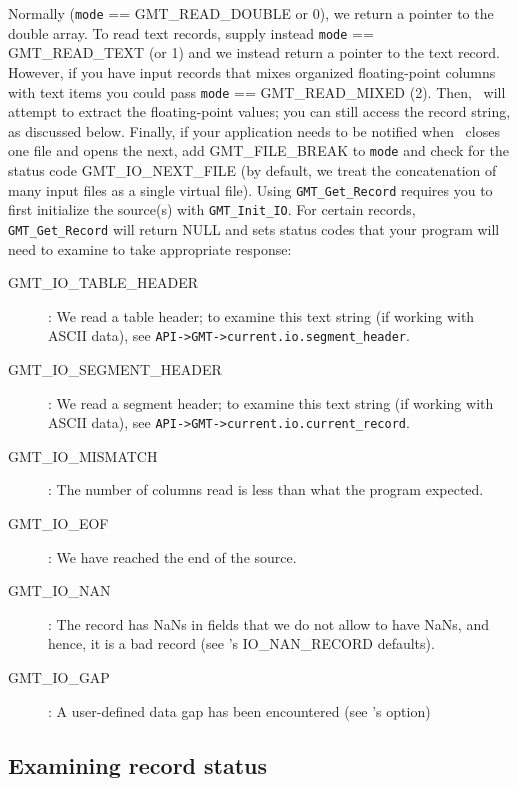 \documentclass[11pt]{report}
\begin{document}
Normally (\texttt{mode} == GMT\_READ\_DOUBLE or 0), we return a pointer to the double array.
To read text records, supply instead \texttt{mode} == GMT\_READ\_TEXT (or 1) and we
instead return a pointer to the text record.
However, if you have input records that mixes organized floating-point columns with text
items you could pass \texttt{mode} == GMT\_READ\_MIXED (2).  Then, \GMT\ will attempt to extract the
floating-point values; you can still access the record string, as discussed below.
Finally, if your application needs to be notified when \GMT\ closes one file and opens the next,
add GMT\_FILE\_BREAK to \texttt{mode} and check for the status code GMT\_IO\_NEXT\_FILE (by
default, we treat the concatenation of many input files as a single virtual file).
Using \texttt{GMT\_Get\_Record} requires you to first initialize the source(s)
with \texttt{GMT\_Init\_IO}.
For certain records, \texttt{GMT\_Get\_Record} will return NULL and sets status codes that your
program will need to examine to take appropriate response:
\begin{description}
\item [GMT\_IO\_TABLE\_HEADER]: We read a table header; to examine this text string
(if working with ASCII data), see \texttt{API->GMT->current.io.segment\_header}.
\item [GMT\_IO\_SEGMENT\_HEADER]: We read a segment header; to examine this text string
(if working with ASCII data), see \texttt{API->GMT->current.io.current\_record}.
\item [GMT\_IO\_MISMATCH]: The number of columns read is less than what the program expected.
\item [GMT\_IO\_EOF]: We have reached the end of the source.
\item [GMT\_IO\_NAN]: The record has NaNs in fields that we do not allow to have NaNs, and
hence, it is a bad record (see \GMT's IO\_NAN\_RECORD defaults). 
\item [GMT\_IO\_GAP]: A user-defined data gap has been encountered (see \GMT's  option)
\end{description}

\subsection{Examining record status}
\end{document}
